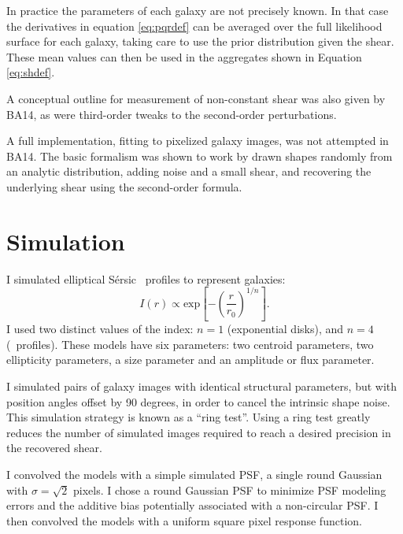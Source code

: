 \documentclass[usegraphicx,usenatbib]{mn2e}
\newcommand{\vecg}{\mbox{\boldmath $g$}}
\newcommand{\vecD}{\mbox{\boldmath $D$}}
\newcommand{\vecQ}{\mbox{\boldmath $Q$}}
\newcommand{\matR}{\mbox{$\bf R$}}
\newcommand{\bnabg}{ \boldsymbol{\nabla_g}}
\newcommand{\sersic}{S\'{e}rsic}
\begin{document}
In practice the parameters of each galaxy are not precisely known. In that case
the derivatives in equation \ref{eq:pqrdef} can be averaged over the full
likelihood surface for each galaxy, taking care to use the prior
distribution given the shear.  These mean values can then be used in the
aggregates shown in Equation \ref{eq:shdef}.

A conceptual outline for measurement of non-constant shear was also given by
BA14, as were third-order tweaks to the second-order perturbations.

A full implementation, fitting to pixelized galaxy images, was not attempted in
BA14.  The basic formalism was shown to work by drawn shapes randomly from an
analytic distribution, adding noise and a small shear, and recovering the
underlying shear using the second-order formula.

\section{Simulation} \label{sec:sim}

I simulated elliptical \sersic\ \citep{Sersic63} profiles to represent galaxies:
\begin{equation}
I(r) \propto \mathrm{exp} \left[ -\left( \frac{r}{r_0} \right)^{1/n} \right].
\end{equation}
I used two distinct values of the index: $n=1$ (exponential
disks), and $n=4$ (\devauc\ profiles).  These models have six parameters:
two centroid parameters, two ellipticity parameters, a size parameter
and an amplitude or flux parameter.

I simulated pairs of galaxy images with identical structural parameters, but
with position angles offset by 90 degrees, in order to cancel the intrinsic
shape noise.  This simulation strategy is known as a ``ring
test''\citep{Nakajima2007}. Using a ring test greatly reduces the number of
simulated images required to reach a desired precision in the recovered shear.

I convolved the models with a simple simulated PSF, a single round Gaussian
with $\sigma = \sqrt{2}$ pixels.  I chose a round Gaussian PSF to minimize PSF
modeling errors and the additive bias potentially associated with a
non-circular PSF.  I then convolved the models with a uniform square pixel
response function.
\end{document}
